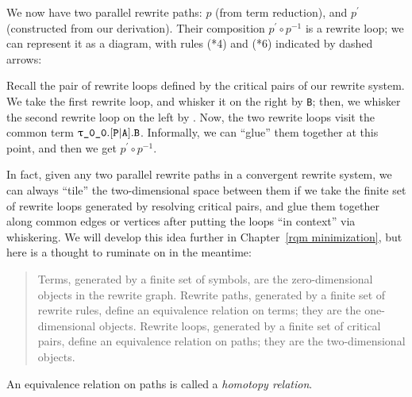\documentclass[../generics]{subfiles}
\begin{document}
\begin{example}
We now have two parallel rewrite paths: $p$ (from term reduction), and $p^\prime$ (constructed from our derivation). Their composition $p^\prime\circ p^{-1}$ is a rewrite loop; we can represent it as a diagram, with rules (*4) and (*6) indicated by dashed arrows:
\begin{center}
\end{center}
Recall the pair of rewrite loops defined by the critical pairs of our rewrite system. We take the first rewrite loop, and whisker it on the right by \texttt{B}; then, we whisker the second rewrite loop on the left by . Now, the two rewrite loops visit the common term $\texttt{$\uptau$\_0\_0}.[\texttt{P}|\texttt{A}].\texttt{B}$. Informally, we can ``glue'' them together at this point, and then we get $p^\prime\circ p^{-1}$.

In fact, given any two parallel rewrite paths in a convergent rewrite system, we can always ``tile'' the two-dimensional space between them if we take the finite set of rewrite loops generated by resolving critical pairs, and glue them together along common edges or vertices after putting the loops ``in context'' via whiskering. We will develop this idea further in Chapter~\ref{rqm minimization}, but here is a thought to ruminate on in the meantime:
\begin{quote}
Terms, generated by a finite set of symbols, are the zero-dimensional objects in the rewrite graph. Rewrite paths, generated by a finite set of rewrite rules, define an equivalence relation on terms; they are the one-dimensional objects. Rewrite loops, generated by a finite set of critical pairs, define an equivalence relation on paths; they are the two-dimensional objects.
\end{quote}
An equivalence relation on paths is called a \emph{homotopy relation}.
\end{example}
\end{document}
